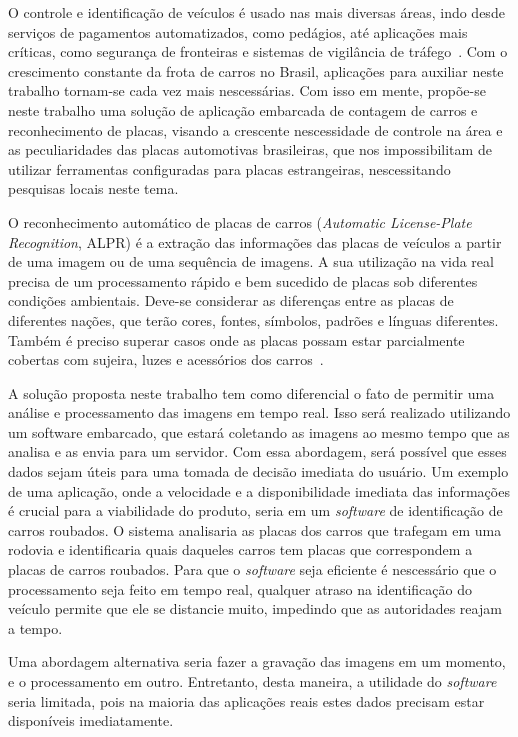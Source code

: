 O controle e identificação de veículos é usado nas mais diversas áreas, indo
desde serviços de pagamentos automatizados, como pedágios, até aplicações mais
críticas, como segurança de fronteiras e sistemas de vigilância de
tráfego~\cite{ahmad2015automatic}. Com o crescimento constante da frota de
carros no Brasil, aplicações para auxiliar neste trabalho tornam-se cada vez
mais nescessárias. Com isso em mente, propõe-se neste trabalho uma solução de
aplicação embarcada de contagem de carros e reconhecimento de placas, visando a
crescente nescessidade de controle na área e as peculiaridades das placas
automotivas brasileiras, que nos impossibilitam de utilizar ferramentas
configuradas para placas estrangeiras, nescessitando pesquisas locais neste
tema.

O reconhecimento automático de placas de carros (\emph{Automatic License-Plate
Recognition}, ALPR) é a extração das informações das placas de veículos a partir
de uma imagem ou de uma sequência de imagens. A sua utilização na vida real
precisa de um processamento rápido e bem sucedido de placas sob diferentes
condições ambientais. Deve-se considerar as diferenças entre as placas de
diferentes nações, que terão cores, fontes, símbolos, padrões e línguas
diferentes. Também é preciso superar casos onde as placas possam estar
parcialmente cobertas com sujeira, luzes e acessórios dos
carros~\cite{s2013automatic}.

A solução proposta neste trabalho tem como diferencial o fato de permitir uma
análise e processamento das imagens em tempo real. Isso será realizado
utilizando um software embarcado, que estará coletando as imagens ao mesmo tempo
que as analisa e as envia para um servidor. Com essa abordagem, será possível
que esses dados sejam úteis para uma tomada de decisão imediata do usuário. Um
exemplo de uma aplicação, onde a velocidade e a disponibilidade imediata das informações é
crucial para a viabilidade do produto, seria em um \emph{software} de identificação 
de carros roubados. O sistema analisaria as placas dos carros que trafegam em uma
rodovia e identificaria quais daqueles carros tem placas que correspondem a placas
de carros roubados. Para que o \emph{software} seja eficiente é nescessário 
que o processamento seja feito em tempo real, qualquer atraso na identificação do
veículo permite que ele se distancie muito, impedindo que as autoridades reajam a tempo.

Uma abordagem alternativa seria fazer a gravação das imagens em um momento, e o
processamento em outro. Entretanto, desta maneira, a utilidade do
\emph{software} seria limitada, pois na maioria das aplicações reais estes dados
precisam estar disponíveis imediatamente.

